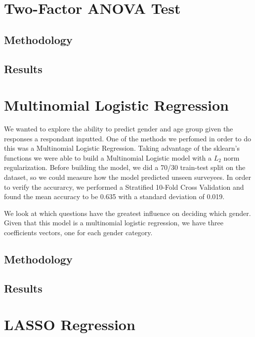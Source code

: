\documentclass{article}
\begin{document}
\newpage

\section{Two-Factor ANOVA Test}

\subsection{Methodology}

\subsection{Results}

\newpage

\section{Multinomial Logistic Regression}
We wanted to explore the ability to predict gender and age group given the responses a respondant inputted. One of the methods we perfomed in order to do this was a Multinomial Logistic Regression. Taking advantage of the sklearn's functions we were able to build a Multinomial Logistic model with a $L_2$ norm regularization. Before building the model, we did a 70/30 train-test split on the dataset, so we could measure how the model predicted unseen surveyees. In order to verify the accurarcy, we performed a Stratified 10-Fold Cross Validation and found the mean accuracy to be 0.635 with a standard deviation of 0.019. 

We look at which questions have the greatest influence on deciding which gender. Given that this model is a multinomial logistic regression, we have three coefficients vectors, one for each gender category. 


\subsection{Methodology}

\subsection{Results}

\newpage

\section{LASSO Regression}
\end{document}
